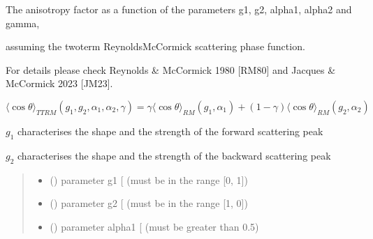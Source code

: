 \documentclass[letterpaper,10pt,english]{sphinxmanual}
\begin{document}
\begin{fulllineitems}
\label{\detokenize{06_anisotropy_factor:skinoptics.anisotropy_factor.costheta_TTRM}}
\pysigstartsignatures
{}
\pysigstopsignatures
\begin{DUlineblock}{0em}
\item[] The anisotropy factor as a function of the parameters g1, g2, alpha1, alpha2 and gamma,
\item[] assuming the two\sphinxhyphen{}term Reynolds\sphinxhyphen{}McCormick scattering phase function.
\item[] For details please check Reynolds \& McCormick 1980 {[}RM80{]} and Jacques \& McCormick 2023 {[}JM23{]}.
\end{DUlineblock}

\sphinxAtStartPar
\(\langle \cos\theta \rangle_{TTRM}(g_1, g_2, \alpha_1, \alpha_2, \gamma) = \gamma \langle \cos\theta \rangle_{RM}(g_1, \alpha_1) + (1 - \gamma) \langle \cos\theta \rangle_{RM}(g_2, \alpha_2)\)

\sphinxAtStartPar
\(g_1\) characterises the shape and the strength of the forward scattering peak

\sphinxAtStartPar
\(g_2\) characterises the shape and the strength of the backward scattering peak
\begin{quote}\begin{description}
\begin{itemize}
\item {} 
\sphinxAtStartPar
{} () \textendash{} parameter g1 {[}\sphinxhyphen{}{]} (must be in the range {[}0, 1{]})

\item {} 
\sphinxAtStartPar
{} () \textendash{} parameter g2 {[}\sphinxhyphen{}{]} (must be in the range {[}\sphinxhyphen{}1, 0{]})

\item {} 
\sphinxAtStartPar
{} () \textendash{} parameter alpha1 {[}\sphinxhyphen{}{]} (must be greater than \sphinxhyphen{}0.5)


\end{itemize}
\end{description}
\end{quote}
\end{fulllineitems}
\end{document}
